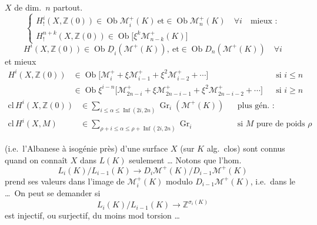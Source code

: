 \documentclass[11pt,a4paper]{article}
\begin{document}
$X$ \struck{\ill{}} de dim.\ $n$ partout.
\[
  \begin{cases}
    H^{i}_{!}(X, \mathbb{Z}(0)) \in \operatorname{Ob} \mathcal{M}^{+}_{i}(K) \ \text{et} \in \operatorname{Ob} \mathcal{M}^{+}_{n}(K) \quad \forall i \quad \text{mieux :} \\
    H^{n+k}_{!}(X, \mathbb{Z}(0)) \in \operatorname{Ob} \bigl[\xi^{k} \mathcal{M}^{+}_{n-k}(K)\bigr]
  \end{cases}
\]
\[
  H^{i}(X, \mathbb{Z}(0)) \in \operatorname{Ob} \underline{D}_{i}(\mathcal{M}^{+}(K)), \ \text{et} \in \operatorname{Ob} D_{n}(\mathcal{M}^{+}(K)) \quad \forall i
\]
et mieux
\[
  \begin{aligned}
    H^{i}(X, \mathbb{Z}(0)) &\in \operatorname{Ob} \bigl[\mathcal{M}^{+}_{i} + \xi \mathcal{M}^{+}_{i-1} + \xi^{2} \mathcal{M}^{+}_{i-2} + \cdots\bigr] && \text{si } i \leq n \\
    &\in \operatorname{Ob} \xi^{i-n} \bigl[\mathcal{M}^{+}_{2n-i} + \xi \mathcal{M}^{+}_{2n-i-1} + \xi^{2} \mathcal{M}^{+}_{2n-i-2} + \cdots\bigr] && \text{si } i \geq n
  \end{aligned}
\]
\[
  \begin{aligned}
    \mathrm{cl}\, H^{i}(X, \mathbb{Z}(0)) &\in \sum_{i \leq \alpha \leq \operatorname{Inf}(2i, 2n)} \operatorname{Gr}_{i}(\mathcal{M}^{+}(K)) && \text{plus gén. :} \\
    \mathrm{cl}\, H^{i}(X, M) &\in \sum_{\rho + i \leq \alpha \leq \rho + \operatorname{Inf}(2i, 2n)} \operatorname{Gr}_{i} && \text{si }M\text{ pure de poids }\rho\text{}
  \end{aligned}
\]

(i.e.\ l'Albanese à isogénie près) d'une surface $X$ (sur $K$ alg.\ clos) sont connus quand on connaît $X$ dans $L(K)$ seulement \ldots
{}
Notons que l'hom.
\[
  L_{i}(K)/L_{i-1}(K) \longrightarrow D_{i}\mathcal{M}^{+}(K) / D_{i-1}\mathcal{M}^{+}(K)
\]
prend ses valeurs dans l'image de $\mathcal{M}^{+}_{i}(K)$ modulo $D_{i-1}\mathcal{M}^{+}(K)$,  i.e.\ dans le \ill{} \ill{} \ill{} \ldots\ On peut se demander si
\[
  \boxed{L_{i}(K)/L_{i-1}(K) \longrightarrow \mathbb{Z}^{\sigma_{i}(K)}}
\]
est injectif, ou surjectif, du moins mod torsion \ldots
{}
\end{document}
